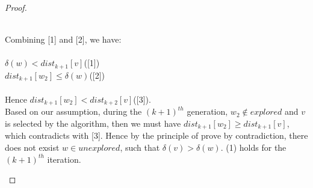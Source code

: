 \documentclass[11pt, oneside]{article}   	%
\newcommand\ftab[1][5cm]{\hspace*{#1}}
\theoremstyle{definition}
\begin{document}
\begin{proof}
\begin{enumerate}
\\
Combining [1] and [2], we have: 
\\\\
\ftab $\delta(w) < dist_{k+1}[v]$([1])\\
\ftab $dist_{k+1}[w_2] \leq \delta(w)$([2])
\\\\
Hence $dist_{k+1}[w_2] < dist_{k+2}[v]$([3]). 
\\
Based on our assumption, during the $(k+1)^{th}$ generation, $w_2 \notin explored$ and $v$ is selected by the algorithm, then we must have $dist_{k+1}[w_2] \geq dist_{k+1}[v]$, which contradicts with [3]. Hence by the principle of prove by contradiction, there does not exsist $w \in unexplored$, such that $\delta(v) > \delta(w)$. (1) holds for the $(k+1)^{th}$ iteration. 



\end{enumerate}
\end{proof}
\end{document}
